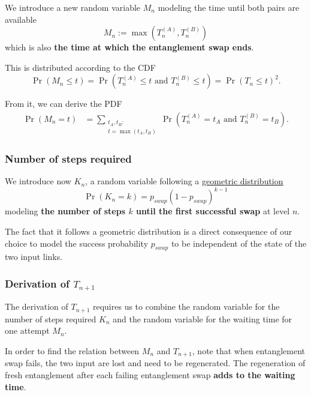 \documentclass{masterthesis}
\begin{document}
We introduce a new random variable $M_n$ modeling the time until both pairs are available
\begin{equation}
    M_n := \max(T_n^{(A)} , T_n^{(B)})
\end{equation}
which is also \textbf{the time at which the entanglement swap ends}. 

This is distributed according to the CDF
\begin{equation}
    \Pr(M_n \leq t) = \Pr(T_n^{(A)} \leq t \text{ and } T_n^{(B)} \leq t) = \Pr(T_n \leq t) ^ 2.
\end{equation}

From it, we can derive the PDF
\begin{align}\label{eq:pdf_waiting_time_pair}
    \Pr(M_n = t) &= \sum_{\substack{t_A, t_B: \\ t = \max(t_A, t_B)}} \Pr(T_n^{(A)} = t_A \text{ and } T_n^{(B)} = t_B) .
\end{align}


\subsubsection*{Number of steps required}

We introduce now $K_n$, a random variable following a \hyperref[subsection:geometric_pdf]{geometric distribution}
\begin{equation}\label{eq:pdf_swap_steps}
    \Pr(K_n = k) = p_{swap} (1 - p_{swap})^{k-1}
\end{equation}
modeling \textbf{the number of steps $k$ until the first successful swap} at level $n$.

The fact that it follows a geometric distribution is a direct consequence of our choice to model the success probability $p_{swap}$ to be independent of the state of the two input links. 

\subsubsection*{Derivation of $T_{n+1}$}
The derivation of $T_{n+1}$ requires us to combine the random variable for the number of steps required $K_n$ and the random variable for the waiting time for one attempt $M_n$.

In order to find the relation between $M_n$ and $T_{n+1}$, note that when entanglement swap fails, the two input are lost and need to be
regenerated. The regeneration of fresh entanglement after each failing entanglement swap \textbf{adds to the waiting time}. 
\end{document}
